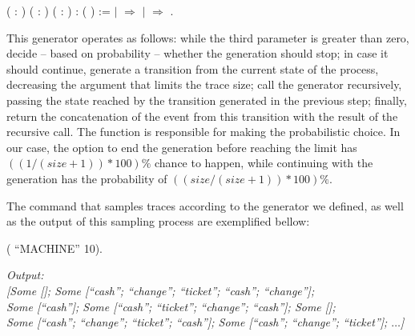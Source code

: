 \begin{coqdoccode}
	\coqdocindent{1.00em}
	( : )\coqdoceol
	\coqdocindent{1.00em}
	( : )\coqdoceol
	\coqdocindent{1.00em}
	( : )\coqdoceol
	\coqdocindent{1.00em}
	:  ( ) :=\coqdoceol
	\coqdocindent{1.00em}
	    \coqdoceol
	\coqdocindent{1.00em}
	\ensuremath{|}  \ensuremath{\Rightarrow}  \coqdoceol
	\coqdocindent{1.00em}
	\ensuremath{|}   \ensuremath{\Rightarrow}    \coqdoceol
	\coqdocindent{1.00em}
	.\coqdoceol
\end{coqdoccode}

This generator operates as follows: while the third parameter is greater than zero, decide -- based on probability -- whether the generation should stop; in case it should continue, generate a transition from the current state of the process, decreasing the argument that limits the trace size; call the generator recursively, passing the state reached by the  transition generated in the previous step; finally, return the concatenation of the event from this transition with the result of the recursive call. The function  is responsible for making the probabilistic choice. In our case, the option to end the generation before reaching the limit has $ ((1 / (size + 1)) * 100)\% $ chance to happen, while continuing with the generation has the probability of $ ((size / (size + 1)) * 100)\% $.

The command that samples traces according to the generator we defined, as well as the output of this sampling process are exemplified bellow:

\begin{coqdoccode}
	\coqdocnoindent
	 (  ``MACHINE'' 10).\coqdoceol
\end{coqdoccode}

\begin{tabbing}
	\emph{Output:}\\
	\emph{[Some []; Some [``cash''; ``change''; ``ticket''; ``cash''; ``change''];}\\
	\emph{Some [``cash'']; Some [``cash''; ``ticket''; ``change''; ``cash'']; Some [];}\\
	\emph{Some [``cash''; ``change''; ``ticket''; ``cash'']; Some [``cash''; ``change''; ``ticket'']; $\dots$]}
\end{tabbing}

